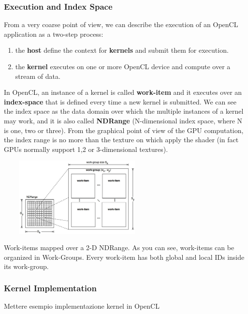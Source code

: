 \subsubsection{Execution and Index Space}

From a very coarse point of view, we can describe the execution of an OpenCL application as a two-step process:

\begin{enumerate}
	\item the \textbf{host} define the context for \textbf{kernels} and submit them for execution.
	\item the \textbf{kernel} executes on one or more OpenCL device and compute over a stream of data.
\end{enumerate}

In OpenCL, an instance of a kernel is called \textbf{work-item} and it executes over an \textbf{index-space} that is defined every time a new kernel is submitted. We can see the index space as the data domain over which the multiple instances of a kernel may work, and it is also called \textbf{NDRange} (N-dimensional index space, where N is one, two or three). From the graphical point of view of the GPU computation, the index range is no more than the texture on which apply the shader (in fact GPUs normally support 1,2 or 3-dimensional textures).\\

\begin{figurehere}
 \centering
 \includegraphics[width=8cm, height=4cm]{./eps/index-space.eps}
 \caption{Work-items mapped over a 2-D NDRange. As you can see, work-items can be organized in Work-Groups. Every work-item has both global and local IDs inside its work-group.}
 \label{fig:indexSpace}
\end{figurehere}

\subsubsection{Kernel Implementation} \label{sect:kernelImplementation}
Mettere esempio implementazione kernel in OpenCL

